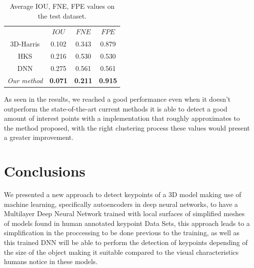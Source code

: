 \documentclass{comjnl}
\begin{document}
\begin{table}
\centering
\begin{tabular}{cccc}
\hline
                    &	$IOU$	    &	$FNE$	        &	$FPE$	  \\
\cline{1-4}
3D-Harris			& 0.102         &	0.343	        &	0.879	  \\
HKS					& 0.216         &	0.530	        &	0.530	  \\
DNN	                & 0.275	        &	0.561	        &	0.561	  \\
\textit{Our method} & \textbf{0.071}&	\textbf{0.211}  &	\textbf{0.915}	  \\

\hline
\end{tabular}
\caption{Average IOU, FNE, FPE values on the test dataset.}
\label{tbl:dnn_features}
\end{table}

As seen in the results, we reached a good performance even when it doesn't
outperform the state-of-the-art current methods it is able to detect a good
amount of interest points with a implementation that roughly approximates to
the method proposed, with the right clustering process these values would
present a greater improvement.

\section{Conclusions} \label{Conclusions}
We presented a new approach to detect keypoints of a 3D model making use of
machine learning, specifically autoencoders in deep neural networks, to have
a Multilayer Deep Neural Network trained with local surfaces of simplified
meshes of models found in human annotated keypoint Data Sets, this approach
leads to a simplification in the proccessing to be done previous to the training,
as well as this trained DNN will be able to perform the detection of keypoints
depending of the size of the object making it suitable compared to the visual 
characteristics humans notice in these models. 


\nocite{*}



% 
% 
\end{document}
